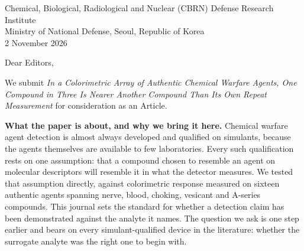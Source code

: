 \documentclass[11pt,letterpaper]{article}
\begin{document}
{\small
Chemical, Biological, Radiological and Nuclear (CBRN) Defense Research
Institute\\
Ministry of National Defense, Seoul, Republic of Korea\\
2 November 2026}

\vspace{6pt}

Dear Editors,

We submit \textit{In a Colorimetric Array of Authentic Chemical Warfare
Agents, One Compound in Three Is Nearer Another Compound Than Its Own Repeat
Measurement} for consideration as an Article.

\textbf{What the paper is about, and why we bring it here.} Chemical warfare
agent detection is almost always developed and qualified on simulants, because
the agents themselves are available to few laboratories. Every such
qualification rests on one assumption: that a compound chosen to resemble an
agent on molecular descriptors will resemble it in what the detector measures.
We tested that assumption directly, against colorimetric response measured on
sixteen authentic agents spanning nerve, blood, choking, vesicant and
A-series compounds. This journal sets the standard for whether a detection
claim has been demonstrated against the analyte it names. The question we ask
is one step earlier and bears on every simulant-qualified device in the
literature: whether the surrogate analyte was the right one to begin with.
\end{document}
